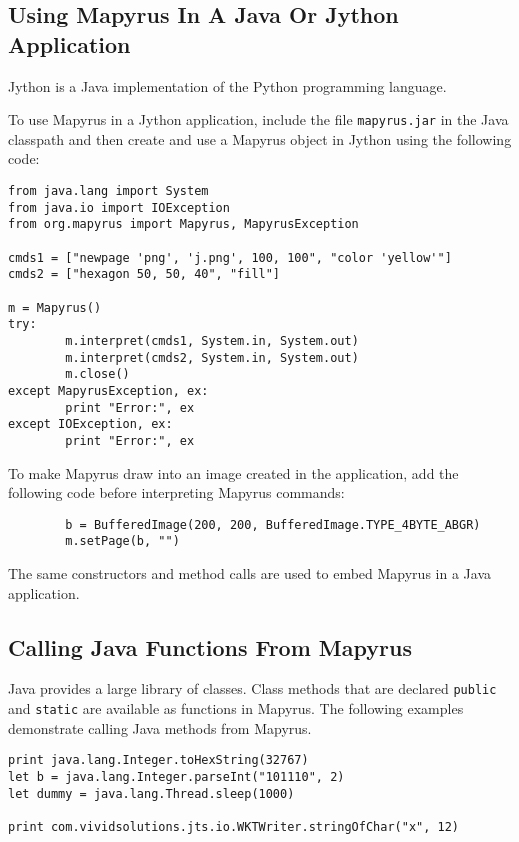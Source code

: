 \subsection{Using Mapyrus In A Java Or Jython Application}

Jython is a Java implementation of the Python programming language.

To use Mapyrus in a Jython application, include the
file \texttt{mapyrus.jar} in the Java classpath and then
create and use a Mapyrus object in Jython using the following code:

\begin{verbatim}
from java.lang import System
from java.io import IOException
from org.mapyrus import Mapyrus, MapyrusException

cmds1 = ["newpage 'png', 'j.png', 100, 100", "color 'yellow'"]
cmds2 = ["hexagon 50, 50, 40", "fill"]

m = Mapyrus()
try:
        m.interpret(cmds1, System.in, System.out)
        m.interpret(cmds2, System.in, System.out)
        m.close()
except MapyrusException, ex:
        print "Error:", ex
except IOException, ex:
        print "Error:", ex
\end{verbatim}

To make Mapyrus draw into an image created in the application,
add the following code before interpreting Mapyrus commands:

\begin{verbatim}
        b = BufferedImage(200, 200, BufferedImage.TYPE_4BYTE_ABGR)
        m.setPage(b, "")
\end{verbatim}

The same constructors and method calls are used to embed
Mapyrus in a Java application.

\subsection{Calling Java Functions From Mapyrus}

Java provides a large library of classes.  Class methods that
are declared \texttt{public} and \texttt{static} are available
as functions in Mapyrus.
The following examples demonstrate calling Java methods from
Mapyrus.

\begin{verbatim}
print java.lang.Integer.toHexString(32767)
let b = java.lang.Integer.parseInt("101110", 2)
let dummy = java.lang.Thread.sleep(1000)

print com.vividsolutions.jts.io.WKTWriter.stringOfChar("x", 12)
\end{verbatim}

